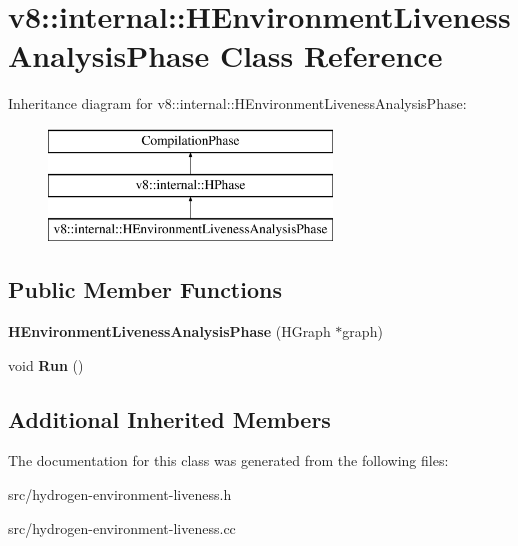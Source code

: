\hypertarget{classv8_1_1internal_1_1_h_environment_liveness_analysis_phase}{}\section{v8\+:\+:internal\+:\+:H\+Environment\+Liveness\+Analysis\+Phase Class Reference}
\label{classv8_1_1internal_1_1_h_environment_liveness_analysis_phase}
Inheritance diagram for v8\+:\+:internal\+:\+:H\+Environment\+Liveness\+Analysis\+Phase\+:\begin{figure}[H]
\begin{center}
\leavevmode
\includegraphics[height=3.000000cm]{classv8_1_1internal_1_1_h_environment_liveness_analysis_phase}
\end{center}
\end{figure}
\subsection*{Public Member Functions}
\begin{DoxyCompactItemize}
\item 
\hypertarget{classv8_1_1internal_1_1_h_environment_liveness_analysis_phase_a70879649cd192269c10bc499852a4778}{}{\bfseries H\+Environment\+Liveness\+Analysis\+Phase} (H\+Graph $\ast$graph)\label{classv8_1_1internal_1_1_h_environment_liveness_analysis_phase_a70879649cd192269c10bc499852a4778}

\item 
\hypertarget{classv8_1_1internal_1_1_h_environment_liveness_analysis_phase_a6891181f8f2f51ca31f5936578939c49}{}void {\bfseries Run} ()\label{classv8_1_1internal_1_1_h_environment_liveness_analysis_phase_a6891181f8f2f51ca31f5936578939c49}

\end{DoxyCompactItemize}
\subsection*{Additional Inherited Members}


The documentation for this class was generated from the following files\+:\begin{DoxyCompactItemize}
\item 
src/hydrogen-\/environment-\/liveness.\+h\item 
src/hydrogen-\/environment-\/liveness.\+cc\end{DoxyCompactItemize}
